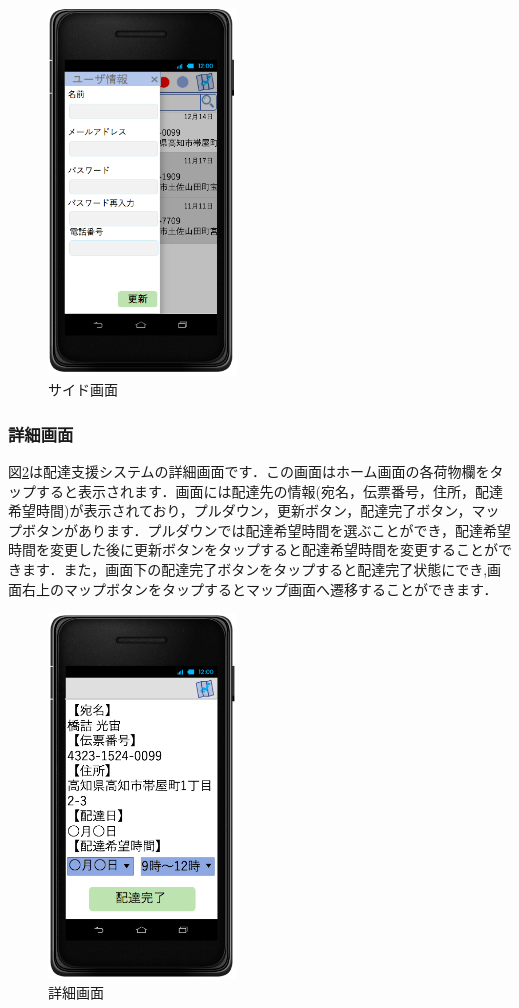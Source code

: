 \documentclass[a4j,titlepage]{jarticle}
\begin{document}
\begin{figure}[H]
 \begin{center}
  \includegraphics[width=50mm]{driver_side.png}
	\caption{サイド画面}
	\label{fig:driver_side}
 \end{center}

\end{figure}
\newpage
\subsubsection{詳細画面}
図\ref{fig:driver_details}は配達支援システムの詳細画面です．この画面はホーム画面の各荷物欄をタップすると表示されます．画面には配達先の情報(宛名，伝票番号，住所，配達希望時間)が表示されており，プルダウン，更新ボタン，配達完了ボタン，マップボタンがあります．プルダウンでは配達希望時間を選ぶことができ，配達希望時間を変更した後に更新ボタンをタップすると配達希望時間を変更することができます．また，画面下の配達完了ボタンをタップすると配達完了状態にでき,画面右上のマップボタンをタップするとマップ画面へ遷移することができます．
\begin{figure}[H]
 \begin{center}
  \includegraphics[width=50mm]{driver_details.png}
	\caption{詳細画面}
	\label{fig:driver_details}
 \end{center}

\end{figure}
\end{document}
